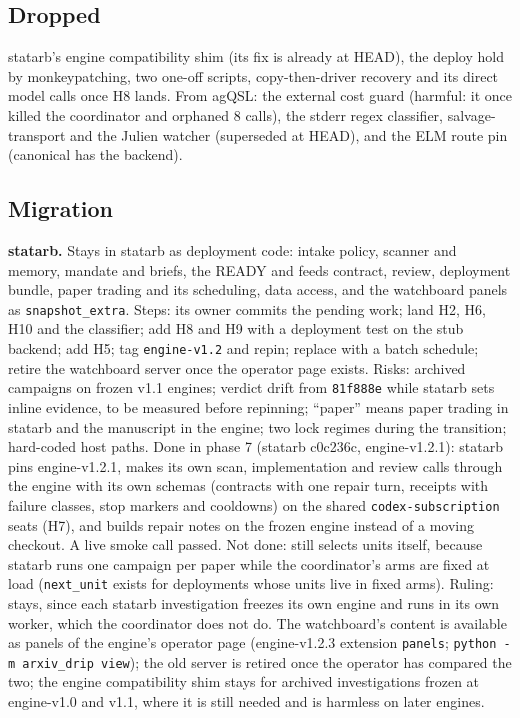 \documentclass[11pt,a4paper]{article}
\begin{document}
\subsection{Dropped}

statarb's engine compatibility shim (its fix is already at HEAD), the deploy hold
by monkeypatching, two one-off scripts, copy-then-driver recovery and its direct
model calls once H8 lands. From agQSL: the external cost guard (harmful: it once
killed the coordinator and orphaned 8 calls), the stderr regex classifier,
salvage-transport and the Julien watcher (superseded at HEAD), and the ELM route
pin (canonical has the backend).

\subsection{Migration}

\textbf{statarb.} Stays in statarb as deployment code: intake policy, scanner and
memory, mandate and briefs, the READY and feeds contract, review, deployment
bundle, paper trading and its scheduling, data access, and the watchboard panels
as \texttt{snapshot\_extra}. Steps: its owner commits the pending
 work; land H2, H6, H10 and the classifier; add H8 and H9 with a
deployment test on the stub backend; add H5; tag \texttt{engine-v1.2} and repin;
replace  with a batch schedule; retire the watchboard server
once the operator page exists. Risks: archived campaigns on frozen v1.1 engines;
verdict drift from \texttt{81f888e} while statarb sets inline evidence, to be
measured before repinning; ``paper'' means paper trading in statarb and the
manuscript in the engine; two lock regimes during the transition; hard-coded host
paths.
Done in phase 7 (statarb c0c236c, engine-v1.2.1): statarb pins engine-v1.2.1, makes its
own scan, implementation and review calls through the engine with its own schemas
(contracts with one repair turn, receipts with failure classes, stop markers and
cooldowns) on the shared \texttt{codex-subscription} seats (H7), and builds repair
notes on the frozen engine instead of a moving checkout. A live smoke call passed.
Not done:  still selects units itself, because statarb runs
one campaign per paper while the coordinator's arms are fixed at load
(\texttt{next\_unit} exists for deployments whose units live in fixed arms). Ruling:
 stays, since each statarb investigation freezes its own engine and
runs in its own worker, which the coordinator does not do. The watchboard's content
is available as panels of the engine's operator page (engine-v1.2.3 extension
\texttt{panels}; \texttt{python -m arxiv\_drip view}); the old server is retired once
the operator has compared the two; the engine compatibility shim stays for archived
investigations frozen at engine-v1.0 and v1.1, where it is still needed and is
harmless on later engines.
\end{document}
